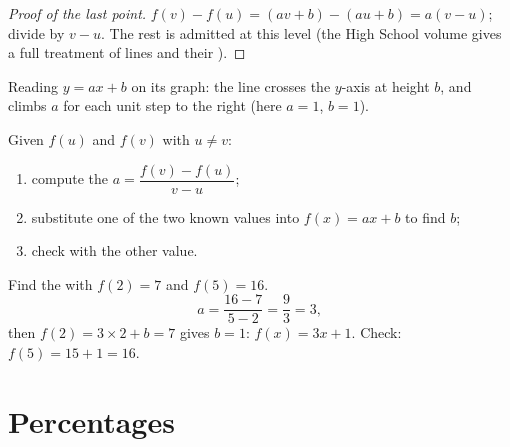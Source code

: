 \begin{proof}[Proof of the last point]
$f(v) - f(u) = (av + b) - (au + b) = a(v - u)$; divide by $v - u$. The
rest is admitted at this level (the High School volume gives a full
treatment of lines and their ).
\end{proof}

\begin{omfigure}

{\small Reading $y = ax + b$ on its graph: the line crosses the $y$-axis
at height $b$, and climbs $a$ for each unit step to the right (here
$a = 1$, $b = 1$).}
\end{omfigure}

\begin{method}\label{met:g9:linfunc:findaffine}
Given $f(u)$ and $f(v)$ with $u \neq v$:
\begin{enumerate}
  \item compute the  $a = \dfrac{f(v) - f(u)}{v - u}$;
  \item substitute one of the two known values into $f(x) = ax + b$ to
        find $b$;
  \item check with the other value.
\end{enumerate}
\end{method}

\begin{example}\label{ex:g9:linfunc:findaffine}
Find the  with $f(2) = 7$ and $f(5) = 16$.
\[
a = \frac{16 - 7}{5 - 2} = \frac93 = 3 ,
\]
then $f(2) = 3 \times 2 + b = 7$ gives $b = 1$: $f(x) = 3x + 1$. Check:
$f(5) = 15 + 1 = 16$.
\end{example}

\section{Percentages}

